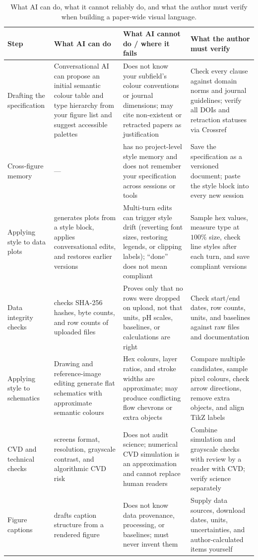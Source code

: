 \begin{table}[htbp]\centering\scriptsize
\setlength{\tabcolsep}{3pt}
\renewcommand{\arraystretch}{1.12}
\caption{What AI can do, what it cannot reliably do, and what the author must verify when building a paper-wide visual language.}\label{tab:ch04-01}
\begin{tabularx}{\linewidth}{@{}>{\raggedright\arraybackslash}p{19mm}YYY@{}}
\toprule
\textbf{Step} & \textbf{What AI can do} & \textbf{What AI cannot do / where it fails} & \textbf{What the author must verify} \\
\midrule
Drafting the specification & Conversational AI can propose an initial semantic colour table and type hierarchy from your figure list and suggest accessible palettes & Does not know your subfield's colour conventions or journal dimensions; may cite non-existent or retracted papers as justification & Check every clause against domain norms and journal guidelines; verify all DOIs and retraction statuses via Crossref \\
Cross-figure memory & --- & \scidraw{} has no project-level style memory and does not remember your specification across sessions or tools & Save the specification as a versioned document; paste the style block into every new session \\
Applying style to data plots &  generates plots from a style block, applies conversational edits, and restores earlier versions & Multi-turn edits can trigger style drift (reverting font sizes, restoring legends, or clipping labels); ``done'' does not mean compliant & Sample hex values, measure type at $100\%$ size, check line styles after each turn, and save compliant versions \\
Data integrity checks &  checks SHA-256 hashes, byte counts, and row counts of uploaded files & Proves only that no rows were dropped on upload, not that units, pH scales, baselines, or calculations are right & Check start/end dates, row counts, units, and baselines against raw files and documentation \\
Applying style to schematics & Drawing and reference-image editing generate flat schematics with approximate semantic colours & Hex colours, layer ratios, and stroke widths are approximate; may produce conflicting flow chevrons or extra objects & Compare multiple candidates, sample pixel colours, check arrow directions, remove extra objects, and align TikZ labels \\
CVD and technical checks &  screens format, resolution, grayscale contrast, and algorithmic CVD risk & Does not audit science; numerical CVD simulation is an approximation and cannot replace human readers & Combine simulation and grayscale checks with review by a reader with CVD; verify science separately \\
Figure captions &  drafts caption structure from a rendered figure & Does not know data provenance, processing, or baselines; must never invent them & Supply data sources, download dates, units, uncertainties, and author-calculated items yourself \\
\bottomrule
\end{tabularx}
\end{table}


